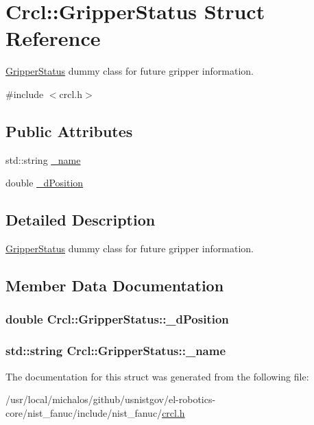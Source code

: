 \hypertarget{structCrcl_1_1GripperStatus}{\section{Crcl\-:\-:Gripper\-Status Struct Reference}
\label{structCrcl_1_1GripperStatus}
}


\hyperlink{structCrcl_1_1GripperStatus}{Gripper\-Status} dummy class for future gripper information.  




{\ttfamily \#include $<$crcl.\-h$>$}

\subsection*{Public Attributes}
\begin{DoxyCompactItemize}
\item 
std\-::string \hyperlink{structCrcl_1_1GripperStatus_aa6975369bf9c1d3b7711940d8dd7441d}{\-\_\-name}
\item 
double \hyperlink{structCrcl_1_1GripperStatus_a206c61416e52e3b758130c6068545cb0}{\-\_\-d\-Position}
\end{DoxyCompactItemize}


\subsection{Detailed Description}
\hyperlink{structCrcl_1_1GripperStatus}{Gripper\-Status} dummy class for future gripper information. 

\subsection{Member Data Documentation}
\hypertarget{structCrcl_1_1GripperStatus_a206c61416e52e3b758130c6068545cb0}{
\subsubsection[{\-\_\-d\-Position}]{\setlength{\rightskip}{0pt plus 5cm}double Crcl\-::\-Gripper\-Status\-::\-\_\-d\-Position}}\label{structCrcl_1_1GripperStatus_a206c61416e52e3b758130c6068545cb0}
\hypertarget{structCrcl_1_1GripperStatus_aa6975369bf9c1d3b7711940d8dd7441d}{
\subsubsection[{\-\_\-name}]{\setlength{\rightskip}{0pt plus 5cm}std\-::string Crcl\-::\-Gripper\-Status\-::\-\_\-name}}\label{structCrcl_1_1GripperStatus_aa6975369bf9c1d3b7711940d8dd7441d}


The documentation for this struct was generated from the following file\-:\begin{DoxyCompactItemize}
\item 
/usr/local/michalos/github/usnistgov/el-\/robotics-\/core/nist\-\_\-fanuc/include/nist\-\_\-fanuc/\hyperlink{crcl_8h}{crcl.\-h}\end{DoxyCompactItemize}
